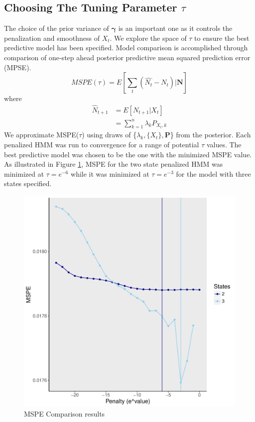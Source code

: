 \documentclass[cmbright,fleqn,referee]{envauth}
\begin{document}
\subsection{Choosing The Tuning Parameter $\tau$}
\label{ss:compare}
The choice of the prior variance of $\bm{\gamma}$ is an important one as it controls the penalization and smoothness of $X_t$. We explore the space of $\tau$ to ensure the best predictive model has been specified. Model comparison is accomplished through comparison of one-step ahead posterior predictive mean squared prediction error (MPSE). 
\begin{equation}
MSPE(\tau) = E\left[ \sum_t (\hat{N_t} - N_t) | \bm{N}\right]
\end{equation}
where
\begin{align}
\hat{N}_{t+1}&= E\left[ N_{t+1} | X_t \right]
\\
&= \sum_{k=1}^n \lambda_k P_{X_t, k}
\end{align}
We approximate MSPE($\tau$) using draws of \{$\lambda_k, \{X_t\}, \mathbf{P}$\} from the posterior.  Each penalized HMM was run to convergence for a range of potential $\tau$ values. The best predictive model was chosen to be the one with the minimized MSPE value. 
As illustrated in Figure \ref{f:MSPEpen2&3}, MSPE for the two state penalized HMM was minimized at $\tau = e^{-6}$ while it was minimized at $\tau = e^{-3}$ for the model with three states specified. 
\begin{figure}
 \centerline{\includegraphics[width=7in]{MSPEcombined_2_0.pdf}}
\caption{MSPE Comparison results }
\label{f:MSPEpen2&3}
\end{figure}
\end{document}

